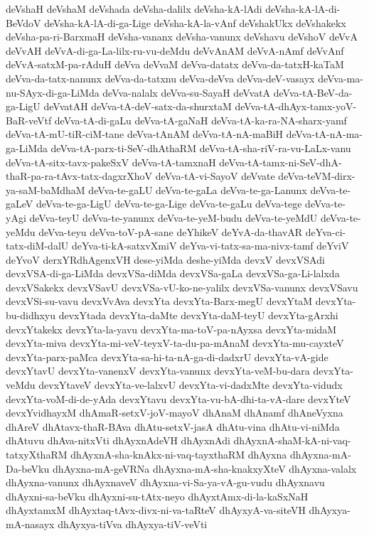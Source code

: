 {deVshaH
deVshaM
deVshada
deVsha-dalilx
deVsha-kA-lAdi
deVsha-kA-lA-di-BeVdoV
deVsha-kA-lA-di-ga-Lige
deVsha-kA-la-vAnf
deVshakUkx
deVshakekx
deVsha-pa-ri-BarxmaH
deVsha-vananx
deVsha-vanunx
deVshavu
deVshoV
deVvA
deVvAH
deVvA-di-ga-La-lilx-ru-vu-deMdu
deVvAnAM
deVvA-nAmf
deVvAnf
deVvA-satxM-pa-rAduH
deVva
deVvaM
deVva-datatx
deVva-da-tatxH-kaTaM
deVva-da-tatx-nanunx
deVva-da-tatxnu
deVva-deVva
deVva-deV-vasayx
deVva-ma-nu-SAyx-di-ga-LiMda
deVva-nalalx
deVva-su-SayaH
deVvatA
deVva-tA-BeV-da-ga-LigU
deVvatAH
deVva-tA-deV-satx-da-shurxtaM
deVva-tA-dhAyx-tamx-yoV-BaR-veVtf
deVva-tA-di-gaLu
deVva-tA-gaNaH
deVva-tA-ka-ra-NA-sharx-yamf
deVva-tA-mU-tiR-ciM-tane
deVva-tAnAM
deVva-tA-nA-maBiH
deVva-tA-nA-ma-ga-LiMda
deVva-tA-parx-ti-SeV-dhAthaRM
deVva-tA-sha-riV-ra-vu-LaLx-vanu
deVva-tA-sitx-tavx-pakeSxV
deVva-tA-tamxnaH
deVva-tA-tamx-ni-SeV-dhA-thaR-pa-ra-tAvx-tatx-dagxrXhoV
deVva-tA-vi-SayoV
deVvate
deVva-teVM-dirx-ya-saM-baMdhaM
deVva-te-gaLU
deVva-te-gaLa
deVva-te-ga-Lanunx
deVva-te-gaLeV
deVva-te-ga-LigU
deVva-te-ga-Lige
deVva-te-gaLu
deVva-tege
deVva-te-yAgi
deVva-teyU
deVva-te-yanunx
deVva-te-yeM-budu
deVva-te-yeMdU
deVva-te-yeMdu
deVva-teyu
deVva-toV-pA-sane
deYhikeV
deYvA-da-thavAR
deYva-ci-tatx-diM-dalU
deYva-ti-kA-satxvXmiV
deYva-vi-tatx-sa-ma-nivx-tamf
deYviV
deYvoV
derxYRdhAgenxVH
dese-yiMda
deshe-yiMda
devxV
devxVSAdi
devxVSA-di-ga-LiMda
devxVSa-diMda
devxVSa-gaLa
devxVSa-ga-Li-lalxda
devxVSakekx
devxVSavU
devxVSa-vU-ko-ne-yalilx
devxVSa-vanunx
devxVSavu
devxVSi-su-vavu
devxVvAva
devxYta
devxYta-Barx-megU
devxYtaM
devxYta-bu-didhxyu
devxYtada
devxYta-daMte
devxYta-daM-teyU
devxYta-gArxhi
devxYtakekx
devxYta-la-yavu
devxYta-ma-toV-pa-nAyxsa
devxYta-midaM
devxYta-miva
devxYta-mi-veV-teyxV-ta-du-pa-mAnaM
devxYta-mu-cayxteV
devxYta-parx-paMca
devxYta-sa-hi-ta-nA-ga-di-dadxrU
devxYta-vA-gide
devxYtavU
devxYta-vanenxV
devxYta-vanunx
devxYta-veM-bu-dara
devxYta-veMdu
devxYtaveV
devxYta-ve-lalxvU
devxYta-vi-dadxMte
devxYta-vidudx
devxYta-voM-di-de-yAda
devxYtavu
devxYta-vu-bA-dhi-ta-vA-dare
devxYteV
devxYvidhayxM
dhAmaR-setxV-joV-mayoV
dhAnaM
dhAnamf
dhAneVyxna
dhAreV
dhAtavx-thaR-BAva
dhAtu-setxV-jasA
dhAtu-vina
dhAtu-vi-niMda
dhAtuvu
dhAva-nitxVti
dhAyxnAdeVH
dhAyxnAdi
dhAyxnA-shaM-kA-ni-vaq-tatxyXthaRM
dhAyxnA-sha-knAkx-ni-vaq-tayxthaRM
dhAyxna
dhAyxna-mA-Da-beVku
dhAyxna-mA-geVRNa
dhAyxna-mA-sha-knakxyXteV
dhAyxna-valalx
dhAyxna-vanunx
dhAyxnaveV
dhAyxna-vi-Sa-ya-vA-gu-vudu
dhAyxnavu
dhAyxni-sa-beVku
dhAyxni-su-tAtx-neyo
dhAyxtAmx-di-la-kaSxNaH
dhAyxtamxM
dhAyxtaq-tAvx-divx-ni-va-taRteV
dhAyxyA-va-siteVH
dhAyxya-mA-nasayx
dhAyxya-tiVva
dhAyxya-tiV-veVti
}
